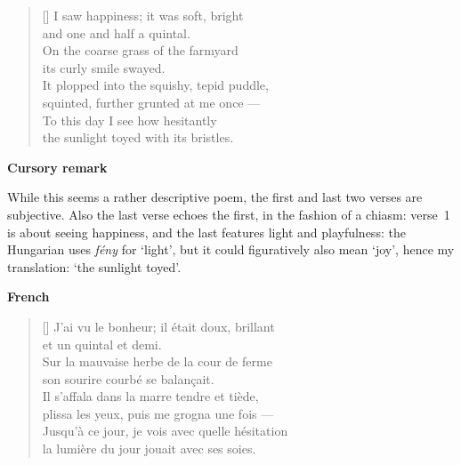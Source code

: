 \documentclass[a4paper,12pt,twoside,final]{book}
\begin{document}
\newpage



\settowidth{\versewidth}{It plopped into the squishy, tepid puddle,}

\begin{verse}[\versewidth]
  I saw happiness; it was soft, bright \\
  and one and half a quintal. \\
  On the coarse grass of the farmyard \\
  its curly smile swayed. \\
  It plopped into the squishy, tepid puddle, \\
  squinted, further grunted at me once --- \\
  To this day I see how hesitantly \\
  the sunlight toyed with its bristles. \\
\end{verse}

\bigskip

\noindent \textbf{Cursory remark}

\medskip

While this seems a rather descriptive poem, the first and last two
verses are subjective. Also the last verse echoes the first, in the
fashion of a chiasm: verse~1 is about seeing happiness, and the last
features light and playfulness: the Hungarian uses \emph{fény} for
`light', but it could figuratively also mean `joy', hence my
translation: `the sunlight toyed'.

\bigskip

\noindent \textbf{French}


\settowidth{\versewidth}{Il s'affala dans la marre tende et tiède,}

\begin{verse}[\versewidth]
  J'ai vu le bonheur; il était doux, brillant \\
  et un quintal et demi. \\
  Sur la mauvaise herbe de la cour de ferme \\
  son sourire courbé se balançait. \\
  Il s'affala dans la marre tendre et tiède, \\
  plissa les yeux, puis me grogna une fois --- \\
  Jusqu'à ce jour, je vois avec quelle hésitation \\
  la lumière du jour jouait avec ses soies. \\
\end{verse}
\end{document}
